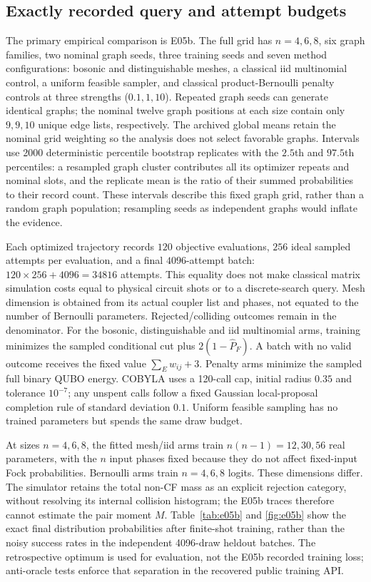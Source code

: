 \documentclass[11pt,a4paper]{article}
\theoremstyle{remark}\newtheorem{remark}[theorem]{Remark}
\begin{document}
\subsection{Exactly recorded query and attempt budgets}
The primary empirical comparison is E05b. The full grid has $n=4,6,8$, six graph families, two nominal graph seeds, three training seeds and seven method configurations: bosonic and distinguishable meshes, a classical iid multinomial control, a uniform feasible sampler, and classical product-Bernoulli penalty controls at three strengths ($0.1,1,10$). Repeated graph seeds can generate identical graphs; the nominal twelve graph positions at each size contain only $9,9,10$ unique edge lists, respectively. The archived global means retain the nominal grid weighting so the analysis does not select favorable graphs. Intervals use 2000 deterministic percentile bootstrap replicates with the $2.5$th and $97.5$th percentiles: a resampled graph cluster contributes all its optimizer repeats and nominal slots, and the replicate mean is the ratio of their summed probabilities to their record count. These intervals describe this fixed graph grid, rather than a random graph population; resampling seeds as independent graphs would inflate the evidence.

Each optimized trajectory records $120$ objective evaluations, $256$ ideal sampled attempts per evaluation, and a final $4096$-attempt batch: $120\times256+4096=34816$ attempts. This equality does not make classical matrix simulation costs equal to physical circuit shots or to a discrete-search query. Mesh dimension is obtained from its actual coupler list and phases, not equated to the number of Bernoulli parameters. Rejected/colliding outcomes remain in the denominator. For the bosonic, distinguishable and iid multinomial arms, training minimizes the sampled conditional cut plus $2(1-\widehat P_F)$. A batch with no valid outcome receives the fixed value $\sum_E w_{ij}+3$. Penalty arms minimize the sampled full binary QUBO energy. COBYLA uses a 120-call cap, initial radius $0.35$ and tolerance $10^{-7}$; any unspent calls follow a fixed Gaussian local-proposal completion rule of standard deviation $0.1$. Uniform feasible sampling has no trained parameters but spends the same draw budget.

At sizes $n=4,6,8$, the fitted mesh/iid arms train $n(n-1)=12,30,56$ real parameters, with the $n$ input phases fixed because they do not affect fixed-input Fock probabilities. Bernoulli arms train $n=4,6,8$ logits. These dimensions differ. The simulator retains the total non-CF mass as an explicit rejection category, without resolving its internal collision histogram; the E05b traces therefore cannot estimate the pair moment $M$. Table~\ref{tab:e05b} and \cref{fig:e05b} show the exact final distribution probabilities after finite-shot training, rather than the noisy success rates in the independent 4096-draw heldout batches. The retrospective optimum is used for evaluation, not the E05b recorded training loss; anti-oracle tests enforce that separation in the recovered public training API.
\end{document}
